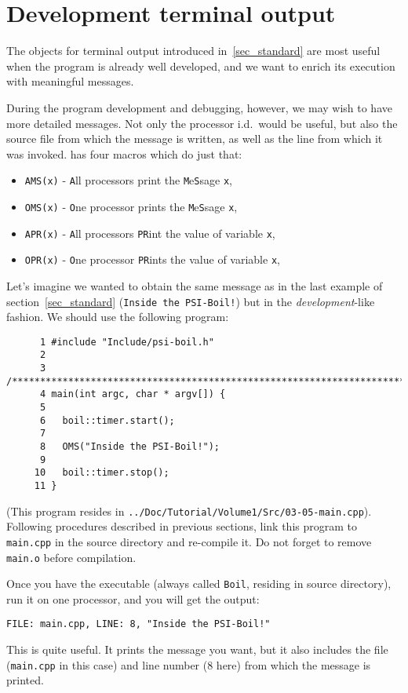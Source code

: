 \section{Development terminal output}
\label{sec_development}

The objects for terminal output introduced in~\ref{sec_standard} are 
most useful when the program is already well developed, and we want to
enrich its execution with meaningful messages. 

During the program development and debugging, however, we may wish to 
have more detailed messages. Not only the processor i.d.\ would be 
useful, but also the source file from which the message is written,
as well as the line from which it was invoked. {\psiboil} has 
four macros which do just that:
%
\begin{itemize}
  \item {\tt AMS(x)} - {\tt A}ll processors print the {\tt M}e{\tt S}sage {\tt x},
  \item {\tt OMS(x)} - {\tt O}ne processor prints the {\tt M}e{\tt S}sage {\tt x},
  \item {\tt APR(x)} - {\tt A}ll processors {\tt PR}int the value of variable {\tt x},
  \item {\tt OPR(x)} - {\tt O}ne processor {\tt PR}ints the value of variable {\tt x},
\end{itemize}
%
Let's imagine we wanted to obtain the same message as in the last example
of section~\ref{sec_standard} ({\tt Inside the PSI-Boil!}) but in the 
{\em development}-like fashion. We should use the following program: 
%
{\small \begin{verbatim}
      1 #include "Include/psi-boil.h"
      2
      3 /****************************************************************************/
      4 main(int argc, char * argv[]) {
      5
      6   boil::timer.start();
      7
      8   OMS("Inside the PSI-Boil!");
      9
     10   boil::timer.stop();
     11 }
\end{verbatim}}
%
(This program resides in {\tt ../Doc/Tutorial/Volume1/Src/03-05-main.cpp}). 
Following procedures described in previous sections, link this program to
{\tt main.cpp} in the source directory and re-compile it. Do not forget
to remove {\tt main.o} before compilation. 

Once you have the executable (always called {\tt Boil}, residing in source
directory), run it on one processor, and you will get the output: 
%
{\small \begin{verbatim}
FILE: main.cpp, LINE: 8, "Inside the PSI-Boil!"
\end{verbatim}}
%
This is quite useful. It prints the message you want, but it also includes
the file ({\tt main.cpp} in this case) and line number (8 here) from which 
the message is printed.

